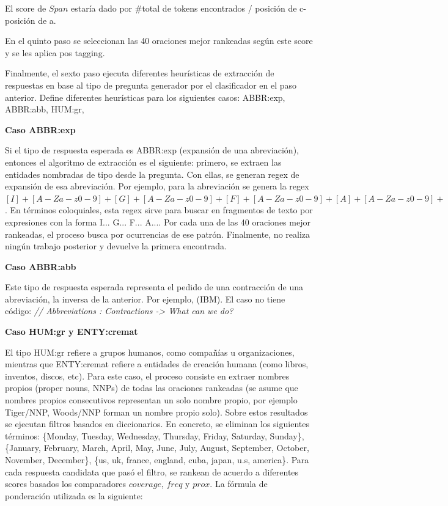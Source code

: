 El score de $Span$ estaría dado por \#total de tokens encontrados /  {\textbar}posición de c- posición de a{\textbar}.



\medskip

En el quinto paso se seleccionan las 40 oraciones mejor rankeadas según este score y se les aplica pos tagging.

Finalmente, el sexto paso ejecuta diferentes heurísticas de extracción de respuestas en base al tipo de pregunta generador por el clasificador en el paso anterior.
Define diferentes heurísticas para los siguientes casos: ABBR:exp, ABBR:abb, HUM:gr,\newline

\textbf{Caso ABBR:exp}\newline

Si el tipo de respuesta esperada es ABBR:exp (expansión de una abreviación), entonces el algoritmo de extracción es el siguiente: primero, se extraen las entidades nombradas de tipo  desde la pregunta. Con ellas, se generan regex de expansión de esa abreviación. Por ejemplo, para la abreviación  se genera la regex $[I]+[A-Za-z0-9]+ [G]+[A-Za-z0-9]+ [F]+[A-Za-z0-9]+ [A]+[A-Za-z0-9]+ $. En términos coloquiales, esta regex sirve para buscar en fragmentos de texto por expresiones con la forma I... G... F... A.... Por cada una de las 40 oraciones mejor rankeadas, el proceso busca por ocurrencias de ese patrón. Finalmente, no realiza ningún trabajo posterior y devuelve la primera encontrada. \newline

\textbf{Caso ABBR:abb}\newline

Este tipo de respuesta esperada representa el pedido de una contracción de una abreviación, la inversa de la anterior. Por ejemplo,  (IBM). El caso no tiene código: \textit{// Abbreviations : Contractions -> What can we do?} \newline

\textbf{Caso HUM:gr y ENTY:cremat} \newline

El tipo HUM:gr refiere a grupos humanos, como compañías u organizaciones, mientras que ENTY:cremat refiere a entidades de creación humana (como libros, inventos, discos, etc).
Para este caso, el proceso consiste en extraer nombres propios (proper nouns, NNPs) de todas las oraciones rankeadas (se asume que nombres propios consecutivos representan un solo nombre propio, por ejemplo Tiger/NNP, Woods/NNP forman un nombre propio solo). Sobre estos resultados se ejecutan filtros basados en diccionarios. En concreto, se eliminan los siguientes términos: \{Monday, Tuesday, Wednesday, Thursday, Friday, Saturday, Sunday\}, \{January, February, March, April, May, June, July, August, September, October, November, December\}, \{us, uk, france, england, cuba, japan, u.s, america\}. Para cada respuesta candidata que pasó el filtro, se rankean de acuerdo a diferentes scores basados los comparadores $coverage$, $freq$ y $prox$.
La fórmula de ponderación utilizada es la siguiente: \\

